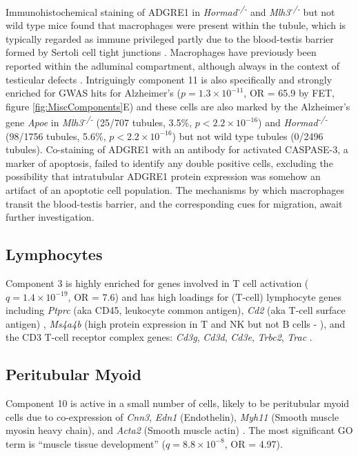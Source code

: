 Immunohistochemical staining of ADGRE1 in \textit{Hormad\textsuperscript{-/-}} and \textit{Mlh3\textsuperscript{-/-}} but not wild type mice found that macrophages were present within the tubule, which is typically regarded as immune privileged partly due to the blood-testis barrier formed by Sertoli cell tight junctions \parencite{Fijak2006testis}. Macrophages have previously been reported within the adluminal compartment, although always in the context of testicular defects \parencite{Frungieri2002Number, Goluza2014Macrophages}. Intriguingly component 11 is also specifically and strongly enriched for GWAS hits for Alzheimer's ($p = 1.3\times10^{-11}$, OR = 65.9 by FET, figure \ref{fig:MiscComponents}E) and these cells are also marked by the Alzheimer's gene \textit{Apoe} in \textit{Mlh3\textsuperscript{-/-}} (25/707 tubules, 3.5\%, $p<2.2\times10^{-16}$) and \textit{Hormad\textsuperscript{-/-}} (98/1756 tubules, 5.6\%, $p<2.2\times10^{-16}$) but not wild type tubules (0/2496 tubules). Co-staining of ADGRE1 with an antibody for activated CASPASE-3, a marker of apoptosis, failed to identify any double positive cells, excluding the possibility that intratubular ADGRE1 protein expression was somehow an artifact of an apoptotic cell population. The mechanisms by which macrophages transit the blood-testis barrier, and the corresponding cues for migration, await further investigation.


\subsection{Lymphocytes}
Component 3 is highly enriched for genes involved in T cell activation ($q = 1.4\times10^{-19}$, OR = 7.6) and has high loadings for (T-cell) lymphocyte genes including \textit{Ptprc} (aka CD45, leukocyte common antigen), \textit{Cd2} (aka T-cell surface antigen) \parencite{Murray2011Protective, Murphy2012Janeway}, \textit{Ms4a4b} (high protein expression in T and NK but not B cells - \cite{Xu2010MS4a4B}), and the CD3 T-cell receptor complex genes: \textit{Cd3g}, \textit{Cd3d}, \textit{Cd3e}, \textit{Trbc2}, \textit{Trac} \parencite{Call2002Organizing}.


\subsection{Peritubular Myoid}

Component 10 is active in a small number of cells, likely to be peritubular myoid cells due to co-expression of \textit{Cnn3}, \textit{Edn1} (Endothelin), \textit{Myh11} (Smooth muscle myosin heavy chain), and \textit{Acta2} (Smooth muscle actin) \parencite{Mayerhofer2013Human}. The most significant GO term is ``muscle tissue development'' ($q = 8.8\times10^{-8}$, OR = 4.97).


